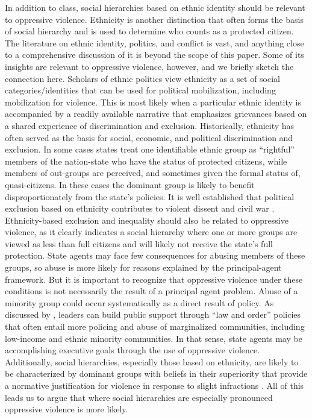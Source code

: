 \documentclass[11pt]{article}
\begin{document}
In addition to class, social hierarchies based on ethnic identity should be relevant to oppressive violence. Ethnicity is another distinction that often forms the basis of social hierarchy and is used to determine who counts as a protected citizen. The literature on ethnic identity, politics, and conflict is vast, and anything close to a comprehensive discussion of it is beyond the scope of this paper. Some of its insights are relevant to oppressive violence, however, and we briefly sketch the connection here. Scholars of ethnic politics view ethnicity as a set of social categories/identities that can be used for political mobilization, including mobilization for violence. This is most likely when a particular ethnic identity is accompanied by a readily available narrative that emphasizes grievances based on a shared experience of discrimination and exclusion. Historically, ethnicity has often served as the basis for social, economic, and political discrimination and exclusion. In some cases states treat one identifiable ethnic group as ``rightful'' members of the nation-state who have the status of protected citizens, while members of out-groups are perceived, and sometimes given the formal status of, quasi-citizens. In these cases the dominant group is likely to benefit disproportionately from the state's policies. It is well established that political exclusion based on ethnicity contributes to violent dissent and civil war \citep{birnir2006ethnicity,cederman2013inequality}.
Ethnicity-based exclusion and inequality should also be related to oppressive violence, as it clearly indicates a social hierarchy where one or more groups are viewed as less than full citizens and will likely not receive the state's full protection. State agents may face few consequences for abusing members of these groups, so abuse is more likely for reasons explained by the principal-agent framework. But it is important to recognize that oppressive violence under these conditions is not necessarily the result of a principal agent problem. Abuse of a minority group could occur systematically as a direct result of policy. As discussed by \citet{Rejali2007}, leaders can build public support through ``law and order'' policies that often entail more policing and abuse of marginalized  communities, including low-income and ethnic minority communities. In that sense, state agents may be accomplishing executive goals through the use of oppressive violence. Additionally, social hierarchies, especially those based on ethnicity, are likely to be characterized by dominant groups with beliefs in their superiority that provide a normative justification for violence in response to slight infractions \citep{sidanius2001social}. All of this leads us to argue that where social hierarchies are especially pronounced oppressive violence is more likely. 
\end{document}
